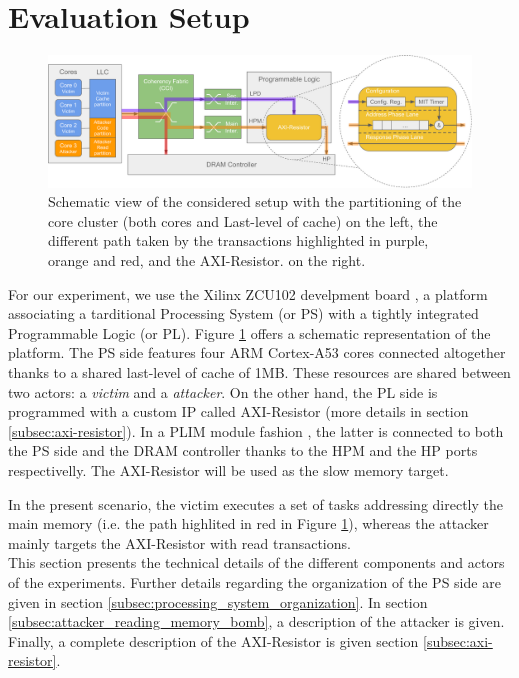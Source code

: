 \section{Evaluation Setup}
    \label{sec:evaluation_setup}
    \begin{figure}
        \centering
        \includegraphics[scale=0.56]{images/Evaluation_setup.pdf}
        \caption{Schematic view of the considered setup with the partitioning of the core cluster (both cores and Last-level of cache) on the left, the different path taken by the transactions highlighted in purple, orange and red, and the AXI-Resistor. on the right.}
        \label{fig:system_schematic}
    \end{figure}
    For our experiment, we use the Xilinx ZCU102 develpment board \cite{Xilinx-ULTRASCALE-TRM}, a platform associating a tarditional Processing System (or PS) with a tightly integrated Programmable Logic (or PL). Figure \ref{fig:system_schematic} offers a schematic representation of the platform.
    The PS side features four ARM Cortex-A53 cores \cite{ARM-cortex-A53} connected altogether thanks to a shared last-level of cache of 1MB. These resources are shared between two actors: a \emph{victim} and a \emph{attacker}.
    On the other hand, the PL side is programmed with a custom IP called AXI-Resistor (more details in section \ref{subsec:axi-resistor}).
    In a PLIM module fashion \cite{PLIM20}, the latter is connected to both the PS side and the DRAM controller thanks to the HPM and the HP ports respectivelly. The AXI-Resistor will be used as the slow memory target.

    In the present scenario, the victim executes a set of tasks addressing directly the main memory (i.e. the path highlited in red in Figure \ref{fig:system_schematic}), whereas the attacker mainly targets the AXI-Resistor with read transactions.\\

    This section presents the technical details of the different components and actors of the experiments.
    Further details regarding the organization of the PS side are given in section \ref{subsec:processing_system_organization}.
    In section \ref{subsec:attacker_reading_memory_bomb}, a description of the attacker is given.
    Finally, a complete description of the AXI-Resistor is given section \ref{subsec:axi-resistor}.

